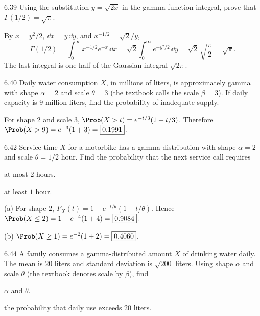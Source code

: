 \documentclass[11pt,oneside]{article}
\begin{document}
\begin{exercise}{6.39}
Using the substitution $y=\sqrt{2x}$ in the gamma-function integral, prove that $\Gamma(1/2)=\sqrt{\pi}$.
\end{exercise}

\begin{solution}
By $x=y^2/2$, $\dd x=y\,\dd y$, and $x^{-1/2}=\sqrt{2}/y$,
\[
\Gamma(1/2)=\int_0^\infty x^{-1/2}e^{-x}\,\dd x
=\sqrt2\int_0^\infty e^{-y^2/2}\,\dd y
=\sqrt2\,\sqrt{\frac\pi2}=\boxed{\sqrt\pi}.
\]
The last integral is one-half of the Gaussian integral $\sqrt{2\pi}$.
\end{solution}

\begin{exercise}{6.40}
Daily water consumption $X$, in millions of liters, is approximately gamma with shape $\alpha=2$ and scale $\theta=3$ (the textbook calls the scale $\beta=3$). If daily capacity is $9$ million liters, find the probability of inadequate supply.
\end{exercise}

\begin{solution}
For shape $2$ and scale $3$, $\Prob(X>t)=e^{-t/3}(1+t/3)$. Therefore $\Prob(X>9)=e^{-3}(1+3)=\boxed{0.1991}$.
\end{solution}

\begin{exercise}{6.42}
Service time $X$ for a motorbike has a gamma distribution with shape $\alpha=2$ and scale $\theta=1/2$ hour. Find the probability that the next service call requires
\begin{exercisesubparts}
\item at most $2$ hours.
\item at least $1$ hour.
\end{exercisesubparts}
\end{exercise}

\begin{solution}
\noindent\textup{(a)} For shape $2$, $F_X(t)=1-e^{-t/\theta}(1+t/\theta)$. Hence $\Prob(X\le2)=1-e^{-4}(1+4)=\boxed{0.9084}$.

\noindent\textup{(b)} $\Prob(X\ge1)=e^{-2}(1+2)=\boxed{0.4060}$.
\end{solution}

\begin{exercise}{6.44}
A family consumes a gamma-distributed amount $X$ of drinking water daily. The mean is $20$ liters and standard deviation is $\sqrt{200}$ liters. Using shape $\alpha$ and scale $\theta$ (the textbook denotes scale by $\beta$), find
\begin{exercisesubparts}
\item $\alpha$ and $\theta$.
\item the probability that daily use exceeds $20$ liters.
\end{exercisesubparts}
\end{exercise}
\end{document}
